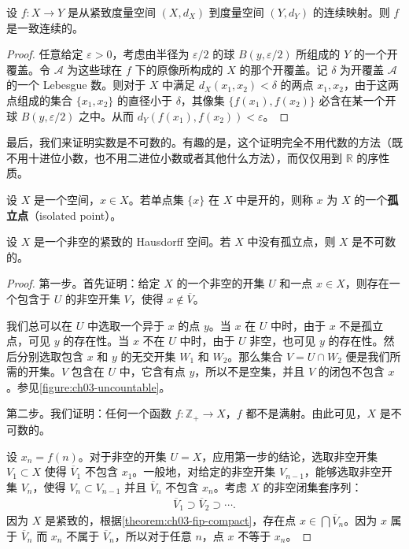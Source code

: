 \begin{theorem}[一致连续性定理]\label{theorem:ch03-uniform-continuity}
设 $f\colon X\to Y$ 是从紧致度量空间 $(X,d_{X})$ 到度量空间 $(Y,d_{Y})$ 的连续映射。则 $f$ 是一致连续的。
\end{theorem}

\begin{proof}
任意给定 $\varepsilon>0$，考虑由半径为 $\varepsilon/2$ 的球 $B(y,\varepsilon/2)$ 所组成的 $Y$ 的一个开覆盖。令 $\mathcal{A}$ 为这些球在 $f$ 下的原像所构成的 $X$ 的那个开覆盖。记 $\delta$ 为开覆盖 $\mathcal{A}$ 的一个 Lebesgue 数。则对于 $X$ 中满足 $d_{X}(x_{1},x_{2})<\delta$ 的两点 $x_{1},x_{2}$，由于这两点组成的集合 $\{x_{1},x_{2}\}$ 的直径小于 $\delta$，其像集 $\{f(x_{1}),f(x_{2})\}$ 必含在某一个开球 $B(y,\varepsilon/2)$ 之中。从而 $d_{Y}(f(x_{1}),f(x_{2}))<\varepsilon$。
\end{proof}

最后，我们来证明实数是不可数的。有趣的是，这个证明完全不用代数的方法（既不用十进位小数，也不用二进位小数或者其他什么方法），而仅仅用到 $\mathbb{R}$ 的序性质。

\begin{definition}\label{definition:ch03-isolated-point}
设 $X$ 是一个空间，$x\in X$。若单点集 $\{x\}$ 在 $X$ 中是开的，则称 $x$ 为 $X$ 的一个\textbf{孤立点}（isolated point）。
\end{definition}

\begin{theorem}\label{theorem:ch03-compact-hausdorff-uncountable}
设 $X$ 是一个非空的紧致的 Hausdorff 空间。若 $X$ 中没有孤立点，则 $X$ 是不可数的。
\end{theorem}

\begin{proof}
第一步。首先证明：给定 $X$ 的一个非空的开集 $U$ 和一点 $x\in X$，则存在一个包含于 $U$ 的非空开集 $V$，使得 $x\notin\overline{V}$。

我们总可以在 $U$ 中选取一个异于 $x$ 的点 $y$。当 $x$ 在 $U$ 中时，由于 $x$ 不是孤立点，可见 $y$ 的存在性。当 $x$ 不在 $U$ 中时，由于 $U$ 非空，也可见 $y$ 的存在性。然后分别选取包含 $x$ 和 $y$ 的无交开集 $W_{1}$ 和 $W_{2}$。那么集合 $V=U\cap W_{2}$ 便是我们所需的开集。$V$ 包含在 $U$ 中，它含有点 $y$，所以不是空集，并且 $V$ 的闭包不包含 $x$。参见\cref{figure:ch03-uncountable}。

第二步。我们证明：任何一个函数 $f\colon\mathbb{Z}_{+}\to X$，$f$ 都不是满射。由此可见，$X$ 是不可数的。

设 $x_{n}=f(n)$。对于非空的开集 $U=X$，应用第一步的结论，选取非空开集 $V_{1}\subset X$ 使得 $\overline{V}_{1}$ 不包含 $x_{1}$。一般地，对给定的非空开集 $V_{n-1}$，能够选取非空开集 $V_{n}$，使得 $V_{n}\subset V_{n-1}$ 并且 $\overline{V}_{n}$ 不包含 $x_{n}$。考虑 $X$ 的非空闭集套序列：
\begin{align*}
\overline{V}_{1}\supset\overline{V}_{2}\supset\cdots.
\end{align*}
因为 $X$ 是紧致的，根据\cref{theorem:ch03-fip-compact}，存在点 $x\in\bigcap\overline{V}_{n}$。因为 $x$ 属于 $\overline{V}_{n}$ 而 $x_{n}$ 不属于 $\overline{V}_{n}$，所以对于任意 $n$，点 $x$ 不等于 $x_{n}$。
\end{proof}

